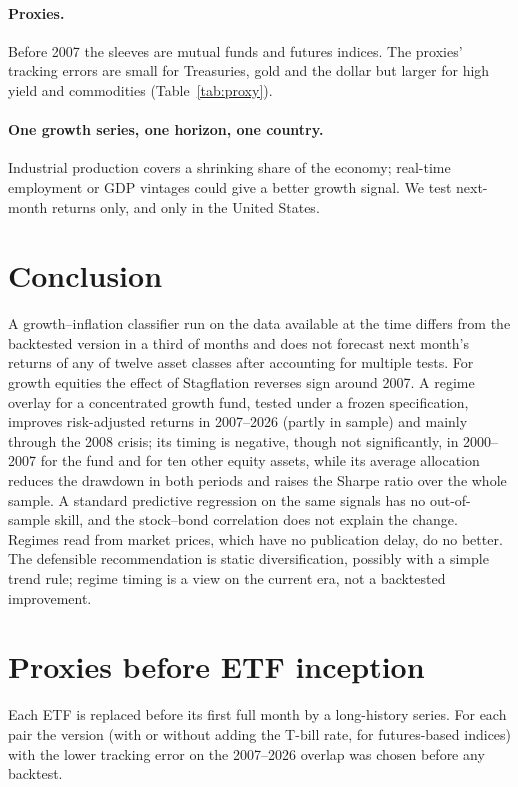 \documentclass[11pt,a4paper]{article}
\begin{document}
\paragraph{Proxies.} Before 2007 the sleeves are mutual funds and futures indices. The proxies' tracking errors are small
for Treasuries, gold and the dollar but larger for high yield and commodities (Table~\ref{tab:proxy}).

\paragraph{One growth series, one horizon, one country.} Industrial production covers a shrinking share of the
economy; real-time employment or GDP vintages could give a better growth signal. We test next-month returns
only, and only in the United States.

\section{Conclusion}

A growth--inflation classifier run on the data available at the time differs from the backtested version in a
third of months and does not forecast next month's returns of any of twelve asset classes after accounting for
multiple tests. For growth equities the effect of Stagflation reverses sign around 2007. A regime overlay for a
concentrated growth fund, tested under a frozen specification, improves risk-adjusted returns in 2007--2026
(partly in sample) and mainly through the 2008 crisis; its timing is negative, though not significantly, in
2000--2007 for the fund and for ten other equity assets, while its
average allocation reduces the drawdown in both periods and raises the Sharpe ratio over the whole sample. A standard predictive regression on the same signals has no out-of-sample skill, and the
stock--bond correlation does not explain the change. Regimes read from market prices, which have no publication
delay, do no better.
The defensible recommendation is static diversification, possibly with a simple trend rule; regime timing is a
view on the current era, not a backtested improvement.

\appendix
\section{Proxies before ETF inception}
\label{app:proxy}

Each ETF is replaced before its first full month by a long-history series. For each pair the version (with or
without adding the T-bill rate, for futures-based indices) with the lower tracking error on the 2007--2026
overlap was chosen before any backtest.
\end{document}
